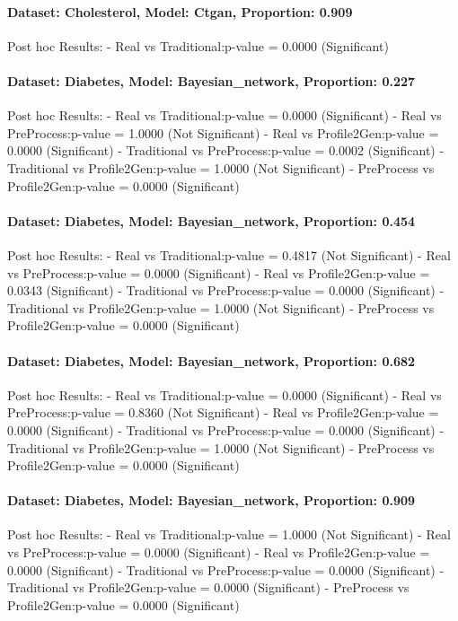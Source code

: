 \documentclass{article}
\theoremstyle{plain}
\theoremstyle{definition}
\theoremstyle{remark}
\begin{document}
\paragraph{Dataset: Cholesterol, Model: Ctgan, Proportion: 0.909
}Post hoc Results:
- Real vs Traditional:p-value = 0.0000 (Significant)

\paragraph{Dataset: Diabetes, Model: Bayesian\_network, Proportion: 0.227
}Post hoc Results:
- Real vs Traditional:p-value = 0.0000 (Significant)
- Real vs PreProcess:p-value = 1.0000 (Not Significant)
- Real vs Profile2Gen:p-value = 0.0000 (Significant)
- Traditional vs PreProcess:p-value = 0.0002 (Significant)
- Traditional vs Profile2Gen:p-value = 1.0000 (Not Significant)
- PreProcess vs Profile2Gen:p-value = 0.0000 (Significant)

\paragraph{Dataset: Diabetes, Model: Bayesian\_network, Proportion: 0.454
}Post hoc Results:
- Real vs Traditional:p-value = 0.4817 (Not Significant)
- Real vs PreProcess:p-value = 0.0000 (Significant)
- Real vs Profile2Gen:p-value = 0.0343 (Significant)
- Traditional vs PreProcess:p-value = 0.0000 (Significant)
- Traditional vs Profile2Gen:p-value = 1.0000 (Not Significant)
- PreProcess vs Profile2Gen:p-value = 0.0000 (Significant)

\paragraph{Dataset: Diabetes, Model: Bayesian\_network, Proportion: 0.682
}Post hoc Results:
- Real vs Traditional:p-value = 0.0000 (Significant)
- Real vs PreProcess:p-value = 0.8360 (Not Significant)
- Real vs Profile2Gen:p-value = 0.0000 (Significant)
- Traditional vs PreProcess:p-value = 0.0000 (Significant)
- Traditional vs Profile2Gen:p-value = 1.0000 (Not Significant)
- PreProcess vs Profile2Gen:p-value = 0.0000 (Significant)

\paragraph{Dataset: Diabetes, Model: Bayesian\_network, Proportion: 0.909
}Post hoc Results:
- Real vs Traditional:p-value = 1.0000 (Not Significant)
- Real vs PreProcess:p-value = 0.0000 (Significant)
- Real vs Profile2Gen:p-value = 0.0000 (Significant)
- Traditional vs PreProcess:p-value = 0.0000 (Significant)
- Traditional vs Profile2Gen:p-value = 0.0000 (Significant)
- PreProcess vs Profile2Gen:p-value = 0.0000 (Significant)
\end{document}
